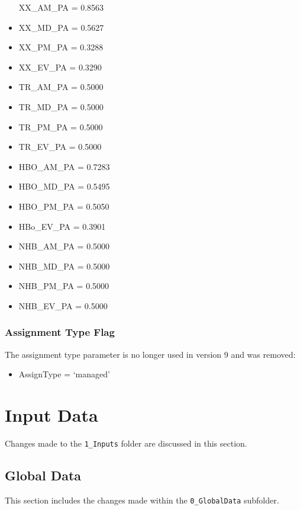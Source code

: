 \documentclass[
  letterpaper,
  DIV=11,
  numbers=noendperiod,
  titlepage=false]{scrreprt}
\providecommand{\tightlist}{%
  \setlength{\itemsep}{0pt}\setlength{\parskip}{0pt}}\usepackage{longtable,booktabs,array}
\begin{document}
\begin{itemize}
  XX\_AM\_PA = 0.8563
\item
  XX\_MD\_PA = 0.5627
\item
  XX\_PM\_PA = 0.3288
\item
  XX\_EV\_PA = 0.3290
\item
  TR\_AM\_PA = 0.5000
\item
  TR\_MD\_PA = 0.5000
\item
  TR\_PM\_PA = 0.5000
\item
  TR\_EV\_PA = 0.5000
\item
  HBO\_AM\_PA = 0.7283
\item
  HBO\_MD\_PA = 0.5495
\item
  HBO\_PM\_PA = 0.5050
\item
  HBo\_EV\_PA = 0.3901
\item
  NHB\_AM\_PA = 0.5000
\item
  NHB\_MD\_PA = 0.5000
\item
  NHB\_PM\_PA = 0.5000
\item
  NHB\_EV\_PA = 0.5000
\end{itemize}

\hypertarget{assignment-type-flag}{%
\subsection{Assignment Type Flag}\label{assignment-type-flag}}

The assignment type parameter is no longer used in version 9 and was
removed:

\begin{itemize}
\tightlist
\item
  AssignType = `managed'
\end{itemize}


\hypertarget{input-data}{%
\chapter{Input Data}\label{input-data}}

Changes made to the \texttt{1\_Inputs} folder are discussed in this
section.

\hypertarget{global-data}{%
\section{Global Data}\label{global-data}}

This section includes the changes made within the \texttt{0\_GlobalData}
subfolder.
\end{document}
